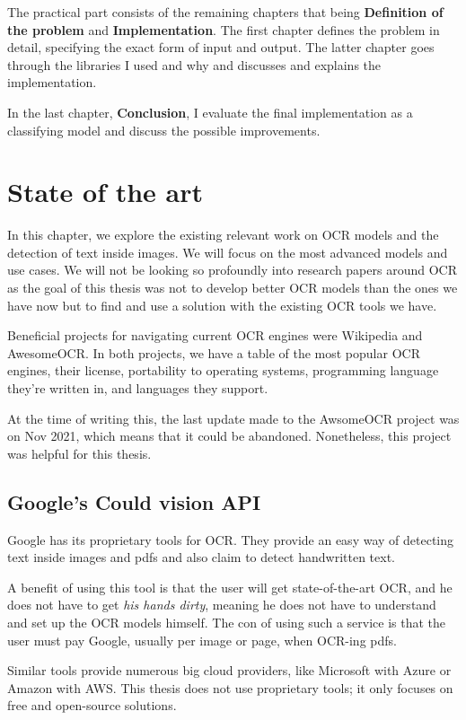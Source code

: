 \documentclass[
  digital,     %
  oneside,     %
  nosansbold,  %
  nocolorbold, %
  nolof,         %
  nolot,         %
]{fithesis4}
\begin{document}
The practical part consists of the remaining chapters that being \textbf{Definition of the problem} and \textbf{Implementation}. The first chapter defines the problem in detail, specifying the exact form of input and output. The latter chapter goes through the libraries I used and why and discusses and explains the implementation.

In the last chapter, \textbf{Conclusion}, I evaluate the final implementation as a classifying model and discuss the possible improvements.

\chapter{State of the art}

In this chapter, we explore the existing relevant work on OCR models and the detection of text inside images. We will focus on the most advanced models and use cases. We will not be looking so profoundly into research papers around OCR as the goal of this thesis was not to develop better OCR models than the ones we have now but to find and use a solution with the existing OCR tools we have.

Beneficial projects for navigating current OCR engines were Wikipedia\cite{ocrwikipedia} and AwesomeOCR\cite{awesomeocr}. In both projects, we have a table of the most popular OCR engines, their license, portability to operating systems, programming language they're written in, and languages they support.

At the time of writing this, the last update made to the AwsomeOCR project was on Nov 2021, which means that it could be abandoned. Nonetheless, this project was helpful for this thesis.

\section{Google's Could vision API \cite{googleapi}}

Google has its proprietary tools for OCR. They provide an easy way of detecting text inside images and pdfs and also claim to detect handwritten text.

A benefit of using this tool is that the user will get state-of-the-art OCR, and he does not have to get \emph{his hands dirty}, meaning he does not have to understand and set up the OCR models himself. The con of using such a service is that the user must pay Google, usually per image or page, when OCR-ing pdfs.

Similar tools provide numerous big cloud providers, like Microsoft with Azure\cite{azurevision} or Amazon with AWS\cite{awstextract}. This thesis does not use proprietary tools; it only focuses on free and open-source solutions.
\end{document}
